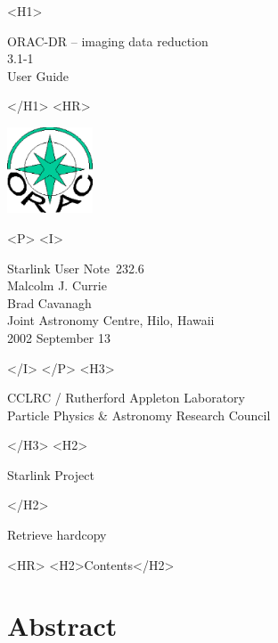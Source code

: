 \documentclass[twoside,11pt]{article}
\newcommand{\stardoccategory}  {Starlink User Note}
\newcommand{\stardocsource}    {sun\stardocnumber}
\newcommand{\stardocnumber}    {232.6}
\newcommand{\stardocauthors}   {Malcolm J. Currie\\
                               Brad Cavanagh\\
                               Joint Astronomy Centre, Hilo, Hawaii}
\newcommand{\stardocdate}      {2002 September 13}
\newcommand{\stardoctitle}     {ORAC-DR -- imaging data reduction}
\newcommand{\stardocversion}   {3.1-1}
\newcommand{\stardocmanual}    {User Guide}
\newcommand{\htmladdnormallink}[2]{#1}
\newcommand{\htmladdimg}[1]{}
\newcommand{\htmlref}[2]{#1}
\newcommand{\htmladdtonavigation}[1]{}
\newcommand{\xlabel}[1]{}
\renewcommand{\_}{\texttt{\symbol{95}}}
\begin{document}
\begin{htmlonly}
   \xlabel{}
   \begin{rawhtml} <H1> \end{rawhtml}
      \stardoctitle\\
      \stardocversion\\
      \stardocmanual
   \begin{rawhtml} </H1> <HR> \end{rawhtml}

\includegraphics[width=1.0in]{sun232_logo.eps}

   \begin{rawhtml} <P> <I> \end{rawhtml}
   \stardoccategory\ \stardocnumber \\
   \stardocauthors \\
   \stardocdate
   \begin{rawhtml} </I> </P> <H3> \end{rawhtml}
      \htmladdnormallink{CCLRC / Rutherford Appleton Laboratory}
                        {http://www.cclrc.ac.uk} \\
      \htmladdnormallink{Particle Physics \& Astronomy Research Council}
                        {http://www.pparc.ac.uk} \\
   \begin{rawhtml} </H3> <H2> \end{rawhtml}
      \htmladdnormallink{Starlink Project}{http://www.starlink.rl.ac.uk/}
   \begin{rawhtml} </H2> \end{rawhtml}
   \htmladdnormallink{\htmladdimg{source.gif} Retrieve hardcopy}
      {http://www.starlink.rl.ac.uk/cgi-bin/hcserver?\stardocsource}\\

  \label{stardoccontents}
  \begin{rawhtml} 
    <HR>
    <H2>Contents</H2>
  \end{rawhtml}
  \htmladdtonavigation{\htmlref{\htmladdimg{contents_motif.gif}}
        {stardoccontents}}

  \section{\xlabel{abstract}Abstract}
\end{htmlonly}
\end{document}
